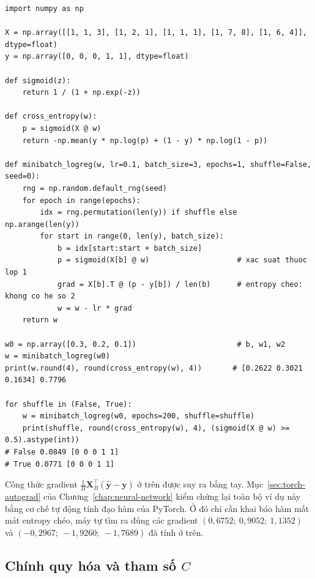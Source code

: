 
\begin{lstlisting}[caption={Mini-batch Gradient Descent cho hồi quy logistic, có và không xáo trộn}]
import numpy as np

X = np.array([[1, 1, 3], [1, 2, 1], [1, 1, 1], [1, 7, 8], [1, 6, 4]], dtype=float)
y = np.array([0, 0, 0, 1, 1], dtype=float)

def sigmoid(z):
    return 1 / (1 + np.exp(-z))

def cross_entropy(w):
    p = sigmoid(X @ w)
    return -np.mean(y * np.log(p) + (1 - y) * np.log(1 - p))

def minibatch_logreg(w, lr=0.1, batch_size=3, epochs=1, shuffle=False, seed=0):
    rng = np.random.default_rng(seed)
    for epoch in range(epochs):
        idx = rng.permutation(len(y)) if shuffle else np.arange(len(y))
        for start in range(0, len(y), batch_size):
            b = idx[start:start + batch_size]
            p = sigmoid(X[b] @ w)                    # xac suat thuoc lop 1
            grad = X[b].T @ (p - y[b]) / len(b)      # entropy cheo: khong co he so 2
            w = w - lr * grad
    return w

w0 = np.array([0.3, 0.2, 0.1])                       # b, w1, w2
w = minibatch_logreg(w0)
print(w.round(4), round(cross_entropy(w), 4))       # [0.2622 0.3021 0.1634] 0.7796

for shuffle in (False, True):
    w = minibatch_logreg(w0, epochs=200, shuffle=shuffle)
    print(shuffle, round(cross_entropy(w), 4), (sigmoid(X @ w) >= 0.5).astype(int))
# False 0.0849 [0 0 0 1 1]
# True 0.0771 [0 0 0 1 1]
\end{lstlisting}

\noindent Công thức gradient $\frac{1}{B}\mathbf{X}_B^\top(\hat{\mathbf{y}} - \mathbf{y})$ ở trên được suy ra bằng tay. Mục~\ref{sec:torch-autograd} của Chương~\ref{chap:neural-network} kiểm chứng lại toàn bộ ví dụ này bằng cơ chế tự động tính đạo hàm của PyTorch. Ở đó chỉ cần khai báo hàm mất mát entropy chéo, máy tự tìm ra đúng các gradient $(0{,}6752;\ 0{,}9052;\ 1{,}1352)$ và $(-0{,}2967;\ -1{,}9260;\ -1{,}7689)$ đã tính ở trên.

\subsection{Chính quy hóa và tham số $C$}

